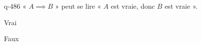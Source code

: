 \begin{truefalse}{q-486}
« $A \implies B$ » peut se lire « $A$ est vraie, donc $B$ est vraie ».
\item Vrai
\item* Faux
\end{truefalse}


